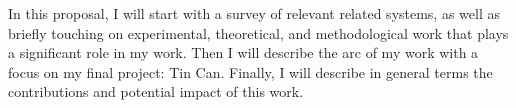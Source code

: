 

In this proposal, I will start with a survey of relevant related systems, as well as briefly touching on experimental, theoretical, and methodological work that plays a significant role in my work. Then I will describe the arc of my  work with a focus on my final project: Tin Can. Finally, I will describe in general terms the contributions and potential impact of this work.